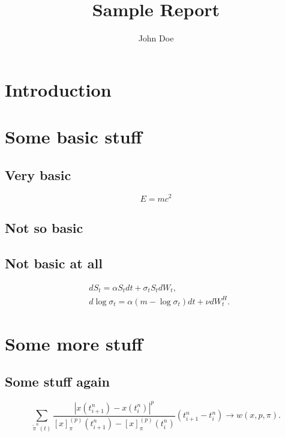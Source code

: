 \documentclass{report}
\title{Sample Report}
\author{John Doe}
\date{}
\begin{document}
    \maketitlepage


    \tableofcontents{}

    \listoffigures{}
    \listoftables{}

    
    \chapter*{Introduction}\setcounter{page}{3}
    \lipsum[1-3]

    \chapter{Some basic stuff}
    \section{Very basic}
    \lipsum[4]
    \begin{equation}
        E = mc^2
    \end{equation}
    \section{Not so basic}
    \lipsum[5-7]
    \section{Not basic at all}
    \begin{align}
        & dS_t          = \alpha S_t dt + \sigma_t S_tdW_t,               \label{model:RFSVasset} \\
        & d\log\sigma_t = \alpha (m - \log\sigma_t) dt + \nu dW_t^H.      \label{model:RFSVvol}
    \end{align}
    \lipsum*[2-4]

    \chapter{Some more stuff}
    \section{Some stuff again}
    \lipsum[8-11]
    \begin{equation}
        \sum_{\tilde\pi^n(t)}\frac{\left|x(t_{i+1}^n) - x(t_i^n)\right|^p}{\left[x\right]_{\pi}^{(p)}(t_{i+1}^n)-\left[x\right]_{\pi}^{(p)}(t_i^n)} (t_{i+1}^n-t_{i}^n) \to w(x, p, \pi).
    \end{equation}
\end{document}
